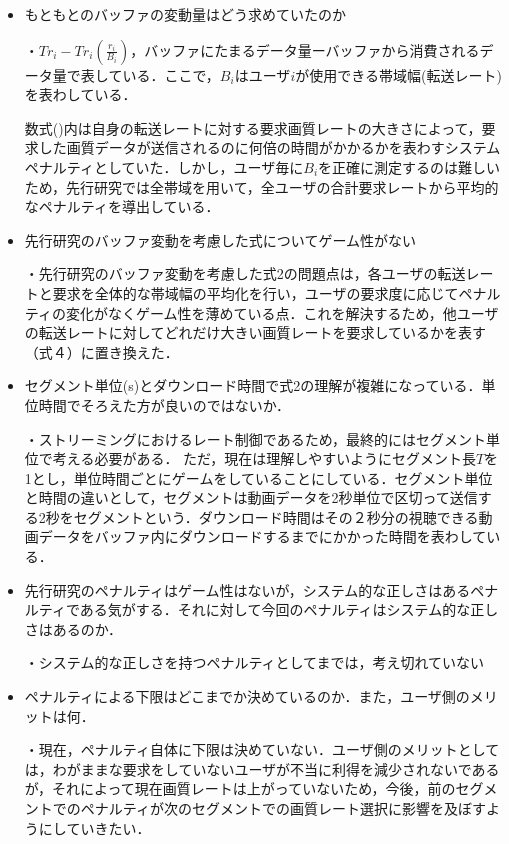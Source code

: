\documentclass[rinkou,a4paper,uplatex]{ieicej}
\begin{document}
\begin{itemize}
    \item
    もともとのバッファの変動量はどう求めていたのか
    
    ・$Tr_i-Tr_i(\frac{r_i}{B_i})$，バッファにたまるデータ量ーバッファから消費されるデータ量で表している．ここで，$B_i$はユーザ$i$が使用できる帯域幅(転送レート)を表わしている．
    
    数式()内は自身の転送レートに対する要求画質レートの大きさによって，要求した画質データが送信されるのに何倍の時間がかかるかを表わすシステムペナルティとしていた．しかし，ユーザ毎に$B_i$を正確に測定するのは難しいため，先行研究では全帯域を用いて，全ユーザの合計要求レートから平均的なペナルティを導出している．

    \item
    先行研究のバッファ変動を考慮した式についてゲーム性がない

    ・先行研究のバッファ変動を考慮した式2の問題点は，各ユーザの転送レートと要求を全体的な帯域幅の平均化を行い，ユーザの要求度に応じてペナルティの変化がなくゲーム性を薄めている点．これを解決するため，他ユーザの転送レートに対してどれだけ大きい画質レートを要求しているかを表す（式４）に置き換えた．

    \item   
    セグメント単位(s)とダウンロード時間で式2の理解が複雑になっている．単位時間でそろえた方が良いのではないか．
    
    ・ストリーミングにおけるレート制御であるため，最終的にはセグメント単位で考える必要がある．
    ただ，現在は理解しやすいようにセグメント長$T$を1とし，単位時間ごとにゲームをしていることにしている．セグメント単位と時間の違いとして，セグメントは動画データを2秒単位で区切って送信する2秒をセグメントという．ダウンロード時間はその２秒分の視聴できる動画データをバッファ内にダウンロードするまでにかかった時間を表わしている．

    \item   
    先行研究のペナルティはゲーム性はないが，システム的な正しさはあるペナルティである気がする．それに対して今回のペナルティはシステム的な正しさはあるのか．

    ・システム的な正しさを持つペナルティとしてまでは，考え切れていない

    
    \item   
    ペナルティによる下限はどこまでか決めているのか．また，ユーザ側のメリットは何．

    ・現在，ペナルティ自体に下限は決めていない．ユーザ側のメリットとしては，わがままな要求をしていないユーザが不当に利得を減少されないであるが，それによって現在画質レートは上がっていないため，今後，前のセグメントでのペナルティが次のセグメントでの画質レート選択に影響を及ぼすようにしていきたい．

    


\end{itemize}
\end{document}
